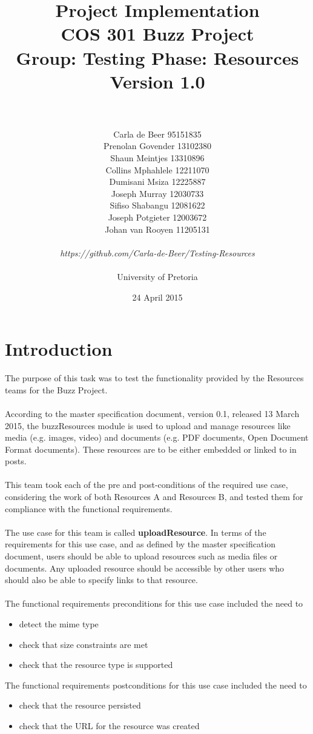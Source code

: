 \documentclass[a4paper]{article}
\title{Project Implementation
\\COS 301 Buzz Project
\\Group: Testing Phase: Resources
\\Version 1.0}
\author{
\\
\\Carla de Beer 95151835
\\Prenolan Govender 13102380
\\Shaun Meintjes 13310896
\\Collins Mphahlele 12211070
\\Dumisani Msiza 12225887
\\Joseph Murray 12030733
\\Sifiso Shabangu 12081622
\\Joseph Potgieter 12003672
\\Johan van Rooyen 11205131
\\
\\
\textit{https://github.com/Carla-de-Beer/Testing-Resources}
\\
\\ University of Pretoria}
\date{24 April 2015}
\begin{document}
\maketitle
\newpage


\tableofcontents
\newpage

\section{Introduction}

The purpose of this task was to test the functionality provided by the Resources teams for the Buzz Project.
\\
\\
According to the master specification document, version 0.1, released 13 March 2015, the buzzResources module is used to upload and manage resources like media (e.g. images, video) and documents (e.g. PDF documents, Open Document Format documents). These resources are to be either embedded or linked to in posts.
\\
\\
This team took each of the pre and post-conditions of the required use case, considering the work of both Resources A and Resources B, and tested them for compliance with the functional requirements. 
\\
\\The use case for this team is called \textbf{uploadResource}. In terms of the requirements for this use case, and as defined by the master specification document, users should be able to upload resources such as media files or documents. Any uploaded resource should be accessible by other users who should also be able to specify links to that resource. 
\\
\\The functional requirements preconditions for this use case included the need to
\begin{itemize}
\item detect the mime type
\item check that size constraints are met
\item check that the resource type is supported
\end{itemize}
The functional requirements postconditions for this use case included the need to
\begin{itemize}
\item check that the resource persisted
\item check that the URL for the resource was created
\end{itemize}
\end{document}
